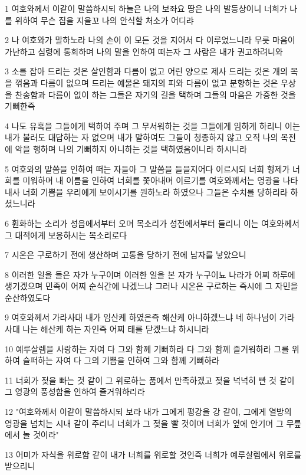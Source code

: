 \par 1 여호와께서 이같이 말씀하시되 하늘은 나의 보좌요 땅은 나의 발등상이니 너희가 나를 위하여 무슨 집을 지을꼬 나의 안식할 처소가 어디랴
\par 2 나 여호와가 말하노라 나의 손이 이 모든 것을 지어서 다 이루었느니라 무릇 마음이 가난하고 심령에 통회하며 나의 말을 인하여 떠는자 그 사람은 내가 권고하려니와
\par 3 소를 잡아 드리는 것은 살인함과 다름이 없고 어린 양으로 제사 드리는 것은 개의 목을 꺾음과 다름이 없으며 드리는 예물은 돼지의 피와 다름이 없고 분향하는 것은 우상을 찬송함과 다름이 없이 하는 그들은 자기의 길을 택하며 그들의 마음은 가증한 것을 기뻐한즉
\par 4 나도 유혹을 그들에게 택하여 주며 그 무서워하는 것을 그들에게 임하게 하리니 이는 내가 불러도 대답하는 자 없으며 내가 말하여도 그들이 청종하지 않고 오직 나의 목전에 악을 행하며 나의 기뻐하지 아니하는 것을 택하였음이니라 하시니라
\par 5 여호와의 말씀을 인하여 떠는 자들아 그 말씀을 들을지어다 이르시되 너희 형제가 너희를 미워하며 내 이름을 인하여 너희를 쫓아내며 이르기를 여호와께서는 영광을 나타내사 너희 기쁨을 우리에게 보이시기를 원하노라 하였으나 그들은 수치를 당하리라 하셨느니라
\par 6 훤화하는 소리가 성읍에서부터 오며 목소리가 성전에서부터 들리니 이는 여호와께서 그 대적에게 보응하시는 목소리로다
\par 7 시온은 구로하기 전에 생산하며 고통을 당하기 전에 남자를 낳았으니
\par 8 이러한 일을 들은 자가 누구이며 이러한 일을 본 자가 누구이뇨 나라가 어찌 하루에 생기겠으며 민족이 어찌 순식간에 나겠느냐 그러나 시온은 구로하는 즉시에 그 자민을 순산하였도다
\par 9 여호와께서 가라사대 내가 임산케 하였은즉 해산케 아니하겠느냐 네 하나님이 가라사대 나는 해산케 하는 자인즉 어찌 태를 닫겠느냐 하시니라
\par 10 예루살렘을 사랑하는 자여 다 그와 함께 기뻐하라 다 그와 함께 즐거워하라 그를 위하여 슬퍼하는 자여 다 그의 기쁨을 인하여 그와 함께 기뻐하라
\par 11 너희가 젖을 빠는 것 같이 그 위로하는 품에서 만족하겠고 젖을 넉넉히 빤 것 같이 그 영광의 풍성함을 인하여 즐거워하리라
\par 12 "여호와께서 이같이 말씀하시되 보라 내가 그에게 평강을 강 같이, 그에게 열방의 영광을 넘치는 시내 같이 주리니 너희가 그 젖을 빨 것이며 너희가 옆에 안기며 그 무릎에서 놀 것이라"
\par 13 어미가 자식을 위로함 같이 내가 너희를 위로할 것인즉 너희가 예루살렘에서 위로를 받으리니
